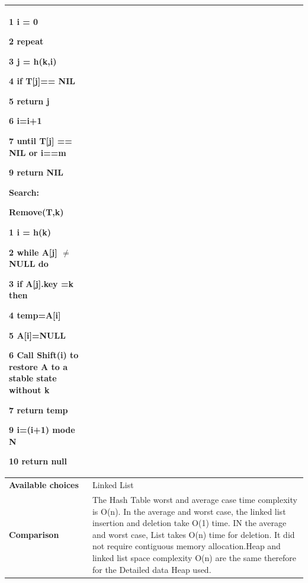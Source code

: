 \documentclass[12pt,a4paper]{article}
\begin{document}
\begin{longtable}{| p{3cm}|p{12cm}|}
1 i = 0

2 repeat

3\hspace{6 mm} j = h(k,i)

4\hspace{6 mm} if T[j]== NIL

5\hspace{12 mm} return j

6\hspace{6 mm} i=i+1

7 until T[j] == NIL or i==m

9 return NIL

\textbf{Search:} 

Remove(T,k)

1 i = h(k)

2 while A[j] $\neq$ NULL do 

3\hspace{6 mm} if A[j].key =k then

4\hspace{12 mm} temp=A[i]

5\hspace{12 mm} A[i]=NULL

6\hspace{12 mm} Call Shift(i) to restore A to a stable state without k

7\hspace{6 mm} return temp

9 i=(i+1) mode N

10 return null

\\\hline
\textbf{Available choices}& Linked List \\ \hline
\textbf{Comparison}&
The Hash Table worst and average case time complexity is O(n). In the average and worst case, the linked list insertion and deletion take O(1) time. IN the average and worst case, List takes O(n) time for deletion. It did not require contiguous memory allocation.Heap and linked list space complexity O(n) are the same therefore for the Detailed  data Heap used.
\\ \hline
\end{longtable}

\end{document}
